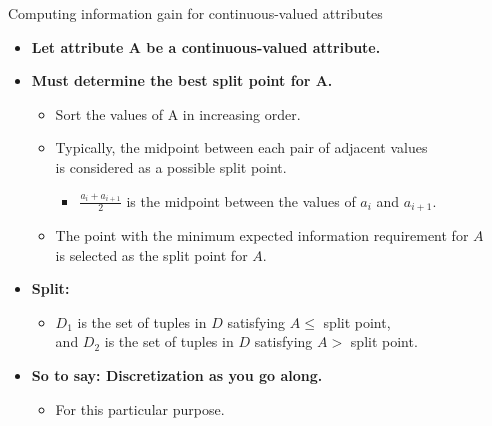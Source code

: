 \documentclass[aspectratio=169,t,table]{beamer}
\begin{document}
  {
    \begin{frame}{Computing information gain for continuous-valued attributes}
      \begin{itemize}
        \item \textbf{Let attribute A be a continuous-valued attribute.}
        \item \textbf{Must determine the best split point for A.}
        \begin{itemize}
          \item Sort the values of A in increasing order.
          \item Typically, the midpoint between each pair of adjacent values \\ is considered as a possible split point.
          \begin{itemize}
            \item $\frac{a_i+a_{i+1}}{2}$ is the midpoint between the values of $a_i$ and $a_{i+1}$.
          \end{itemize}
          \item The point with the minimum expected information requirement for $A$ \\ is selected as the split point for $A$.
        \end{itemize}
        \item \textbf{Split:}
        \begin{itemize}
          \item $D_1$ is the set of tuples in $D$ satisfying $A \leq$ split point,\\
                and $D_2$ is the set of tuples in $D$ satisfying $A >$ split point.
        \end{itemize}
        \item \textbf{So to say: Discretization as you go along.}
        \begin{itemize}
          \item For this particular purpose.
        \end{itemize}
      \end{itemize}
    \end{frame}
  }
\end{document}

